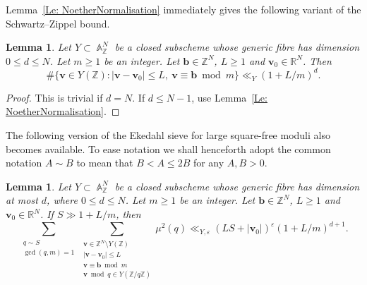 \documentclass[a4paper,11pt, twoside,reqno]{amsart}
\theoremstyle{plain}
\newtheorem{lemma}[thm]{Lemma}
\theoremstyle{definition}
\theoremstyle{remark}
\newcommand{\bfb}{\bm{b}}
\newcommand{\bfv}{\bm{v}}
\newcommand{\ZZ}{\mathbb{Z}}
\newcommand{\RR}{\mathbb{R}}
\DeclareMathOperator{\A}{\mathbb{A}}
\newcommand{\ve}{\varepsilon}
\renewcommand{\le}{\leqslant}
\renewcommand{\leq}{\leqslant}
\renewcommand{\ge}{\geqslant}
\numberwithin{equation}{section}
\begin{document}
Lemma~\ref{Le: NoetherNormalisation} immediately gives
the following variant of the Schwartz--Zippel bound.

\begin{lemma}
\label{LEM:basically-zippel}
Let $Y\subset\A_\ZZ^N$ be a closed subscheme whose
generic fibre
has dimension $0\le d\le N$.
Let $m\ge1$ be an integer.
Let $\bfb\in\ZZ^N$,
$L\ge1$ and $\bfv_0\in\RR^N$.
Then
\begin{equation*}
\#\{\bfv\in Y(\ZZ):|\bfv-\bfv_0|\le L,\ 
\bfv\equiv\bfb\bmod m\}
\ll_Y (1+L/m)^d.
\end{equation*}
\end{lemma}

\begin{proof}
This is trivial if $d=N$.
If $d\le N-1$, use Lemma~\ref{Le: NoetherNormalisation}.
\end{proof}

The following version of the Ekedahl sieve
for large square-free moduli
also becomes available.
To ease notation we shall henceforth adopt the common notation $A\sim B$ to mean that 
$B<A\leq 2B$ for any $A,B>0$.

\begin{lemma}
\label{Le: StratGeoSieveStep1}
Let $Y\subset\A_\ZZ^N$ be a closed subscheme whose
generic fibre
has dimension at most $d$,
where $0\le d\le N$.
Let $m\ge1$ be an integer.
Let $\bfb\in\ZZ^N$,
$L\ge1$ and $\bfv_0\in\RR^N$.
If $S \gg 1 + L/m$, then
\begin{equation*}
\sum_{\substack{q\sim S \\
\gcd(q,m)=1}}
\sum_{\substack{\bfv\in \ZZ^N \setminus Y(\ZZ) \\
|\bfv-\bfv_0|\le L \\
\bfv\equiv\bfb\bmod m \\
\bfv\bmod q\in Y(\ZZ/q\ZZ)}}
\mu^2(q)
\ll_{Y,\ve} (LS+|\bfv_0|)^\ve (1 + L/m)^{d+1}.
\end{equation*}
\end{lemma}
\end{document}
